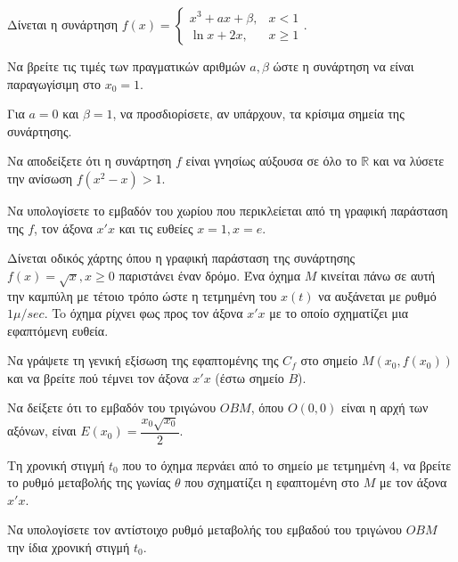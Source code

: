 \documentclass[a4paper,11pt,twoside]{article}
\newcommand{\kerkissans}[1]{{\fontfamily{maksf}\selectfont {#1}}}
\newcommand\thema{Γ}
\newcounter{askhsh}[section]
\renewcommand{\theaskhsh}{\arabic{askhsh}}
\newcommand{\Askhsh}{\refstepcounter{askhsh}{\textbf{\textcolor{black}{\faPenSquare\ \  \large \kerkissans{\textbf{\theaskhshο\hspace{2mm}Θέμα}}}}}\hspace{0mm}}{}
\newenvironment{askhsh}[1]
{\begin{tcolorbox}[title=\Askhsh\kerkissans{\textbf{\large{  #1}}},breakable,
enhanced standard,titlerule=0pt,toprule=0pt, rightrule=0pt, bottomrule=0pt,
colback=white,left=0mm,top=1mm,bottom=0mm,
boxrule=0pt,
colframe=white,leftrule=0mm,sharp corners,coltitle=black]
\renewcommand{\thema}{#1}}
{\end{tcolorbox}}
\begin{document}
\begin{askhsh}{Γ}
Δίνεται η συνάρτηση $f(x) = \begin{cases} x^3 + ax + \beta, & x < 1 \\ \ln x + 2x, & x \ge 1 \end{cases}$.
\begin{erwthma}
  \item Να βρείτε τις τιμές των πραγματικών αριθμών $a, \beta$ ώστε η συνάρτηση να είναι παραγωγίσιμη στο $x_0=1$.
  \item Για $a = 0$ και $\beta = 1$, να προσδιορίσετε, αν υπάρχουν, τα κρίσιμα σημεία της συνάρτησης.
  \item Να αποδείξετε ότι η συνάρτηση $f$ είναι γνησίως αύξουσα σε όλο το $\mathbb{R}$ και να λύσετε την ανίσωση $f(x^2 - x) > 1$.
  \item Να υπολογίσετε το εμβαδόν του χωρίου που περικλείεται από τη γραφική παράσταση της $f$, τον άξονα $x'x$ και τις ευθείες $x=1, x=e$.
\end{erwthma}
\end{askhsh}

\begin{askhsh}{Γ}
Δίνεται οδικός χάρτης όπου η γραφική παράσταση της συνάρτησης $f(x) = \sqrt{x}, x \ge 0$ παριστάνει έναν δρόμο. Ένα όχημα $M$ κινείται πάνω σε αυτή την καμπύλη με τέτοιο τρόπο ώστε η τετμημένη του $x(t)$ να αυξάνεται με ρυθμό $1 \mu/\si{sec}$. To όχημα ρίχνει φως προς τον άξονα $x'x$ με το οποίο σχηματίζει μια εφαπτόμενη ευθεία.
\begin{erwthma}
  \item Να γράψετε τη γενική εξίσωση της εφαπτομένης της $C_f$ στο σημείο $M(x_0, f(x_0))$ και να βρείτε πού τέμνει τον άξονα $x'x$ (έστω σημείο $B$).
  \item Να δείξετε ότι το εμβαδόν του τριγώνου $O B M$, όπου $O(0,0)$ είναι η αρχή των αξόνων, είναι $E(x_0) = \dfrac{x_0\sqrt{x_0}}{2}$.
  \item Τη χρονική στιγμή $t_0$ που το όχημα περνάει από το σημείο με τετμημένη $4$, να βρείτε το ρυθμό μεταβολής της γωνίας $\theta$ που σχηματίζει η εφαπτομένη στο $M$ με τον άξονα $x'x$.
  \item Να υπολογίσετε τον αντίστοιχο ρυθμό μεταβολής του εμβαδού του τριγώνου $O B M$ την ίδια χρονική στιγμή $t_0$.
\end{erwthma}
\end{askhsh}
\end{document}
